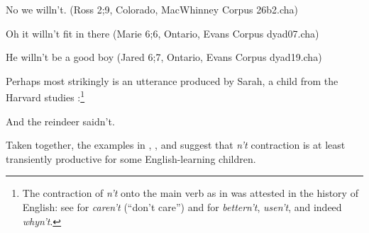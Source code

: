 \documentclass[output=paper,
modfonts
]{LSP/langsci}
\begin{document}
\begin{exe} \ex \label{willnt}
\begin{xlist} 
\item No we willn't. \label{rosswill} (Ross 2;9, Colorado, MacWhinney Corpus 26b2.cha)
\item Oh it willn't fit in there  (Marie 6;6, Ontario, Evans Corpus dyad07.cha)
\item He willn't be a good boy (Jared 6;7,  Ontario, Evans Corpus dyad19.cha)
\end{xlist} \end{exe}
Perhaps most strikingly is an utterance produced by Sarah, a child
from the Harvard studies \citep{Brown1973}:\footnote{The contraction of \textit{n't} onto the main verb as in  was 
attested in the history of English: see \citealt{Brainerd1989} for
 \textit{  caren't} (``don't care'') and \citealt{Jespersen1917} for \textit{bettern't}, \textit{usen't}, and indeed \textit{whyn't}.\label{caren't}}

\begin{exe} \ex \label{sarah}
And the reindeer saidn't. \end{exe}

\noindent Taken together, the examples in , , and
 suggest that  \textit{n't}
contraction is at least transiently productive for some English-learning children. 
\end{document}
